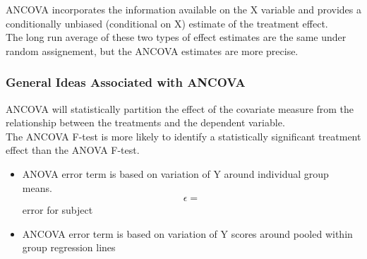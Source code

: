 ANCOVA incorporates the information available on the X variable and provides a conditionally unbiased (conditional on X) estimate of the treatment effect.\\

The long run average of these two types of effect estimates are the same under random assignement, but the ANCOVA estimates are more precise. 

\subsubsection*{General Ideas Associated with ANCOVA}
ANCOVA will statistically partition the effect of the covariate measure from the relationship between the treatments and the dependent variable.\\

The ANCOVA F-test is more likely to identify a statistically significant treatment effect than the ANOVA F-test.

\begin{itemize}
  \item ANOVA error term is based on variation of Y around individual group means. 
  \begin{align}
    \epsilon = 
  \end{align}
  error for subject 
  \item ANCOVA error term is based on variation of Y scores around pooled within group regression lines
\end{itemize}



